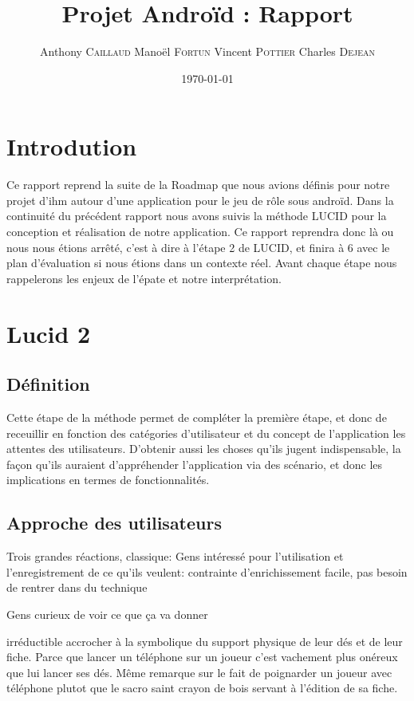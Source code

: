 \documentclass[11pt,a4paper]{article}
\title{Projet Androïd : Rapport}
\author{Anthony \textsc{Caillaud} Manoël \textsc{Fortun} Vincent
\textsc{Pottier} Charles \textsc{Dejean}}
\date{\today}
\begin{document}
\maketitle

\clearpage
\tableofcontents
\clearpage
\section{Introdution}

Ce rapport reprend la suite de la Roadmap que nous avions définis pour notre
projet d'ihm autour d'une application pour le jeu de rôle sous androïd.
Dans la continuité du précédent rapport nous avons suivis la méthode LUCID pour
la conception et réalisation de notre application. Ce rapport reprendra donc là
ou nous nous étions arrêté, c'est à dire à l'étape 2 de LUCID, et finira à 6
avec le plan d'évaluation si nous étions dans un contexte réel.
Avant chaque étape nous rappelerons les enjeux de l'épate et notre
interprétation.

\clearpage

\section{Lucid 2}

\subsection{Définition}

Cette étape de la méthode permet de compléter la première étape, et donc de
receuillir en fonction des catégories d'utilisateur et du concept de
l'application les attentes des utilisateurs. D'obtenir aussi les choses qu'ils
jugent indispensable, la façon qu'ils auraient d'appréhender l'application via
des scénario, et donc les implications en termes de fonctionnalités.

\subsection{Approche des utilisateurs}


Trois grandes réactions, classique:
Gens intéressé pour l'utilisation et l'enregistrement de ce qu'ils veulent:
contrainte d'enrichissement facile, pas besoin de rentrer dans du technique


Gens curieux de voir ce que ça va donner

irréductible accrocher à la symbolique du support physique de leur dés et de
leur fiche. Parce que lancer un téléphone sur un joueur c'est vachement plus
onéreux que lui lancer ses dés. Même remarque sur le fait de poignarder un
joueur avec téléphone plutot que le sacro saint crayon de bois servant à
l'édition de sa fiche.
\end{document}
